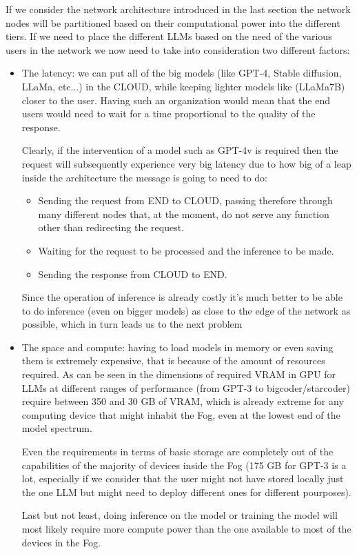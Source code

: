 If we consider the network architecture introduced in the last section the network nodes will be
partitioned based on their computational power into the different tiers. If we need to place the
different LLMs based on the need of the various users in the network we now need to take into
consideration two different factors:
\begin{itemize}
	\item The latency: we can put all of the big models (like GPT-4, Stable diffusion, LLaMa,
	      etc...) in the CLOUD, while keeping lighter models like (LLaMa7B) closer to the
	      user. Having such an organization would mean that the end users would need to wait for a time proportional to the quality of the response.

	      Clearly, if the intervention of a model such as GPT-4v is required then the request will subsequently experience very big latency due to how big of a leap inside the architecture the message is going to need to do:
	      \begin{itemize}
		      \item Sending the request from END to CLOUD, passing therefore through many
		            different nodes that, at the moment, do not serve any function other
		            than redirecting the request.
		      \item Waiting for the request to be processed and the inference to be made.
		      \item Sending the response from CLOUD to END.
	      \end{itemize}
	      Since the operation of inference is already costly it's much better to be able to do
	      inference (even on bigger models) as close to the edge of the network as possible, which in turn leads us to the next problem

	\item The space and compute: having to load models in memory or even saving them is
	      extremely expensive, that is because of the amount of resources required.
	      As can be seen in \cite{hug-optimization} the dimensions of required VRAM in GPU for LLMs at
	      different ranges of performance (from GPT-3 to bigcoder/starcoder) require between 350 and
	      30 GB of VRAM, which is already extreme for any computing device that might inhabit the Fog, even at the lowest end of the model spectrum.

	      Even the requirements in terms of basic storage are completely out of the capabilities of
	      the majority of devices inside the Fog (175 GB for GPT-3 is a lot, especially if we consider
	      that the user might not have stored locally just the one LLM but might need to deploy different ones for different pourposes).

	      Last but not least, doing inference on the model or training the model will most likely
	      require more compute power than the one available to most of the devices in the Fog.
\end{itemize}

